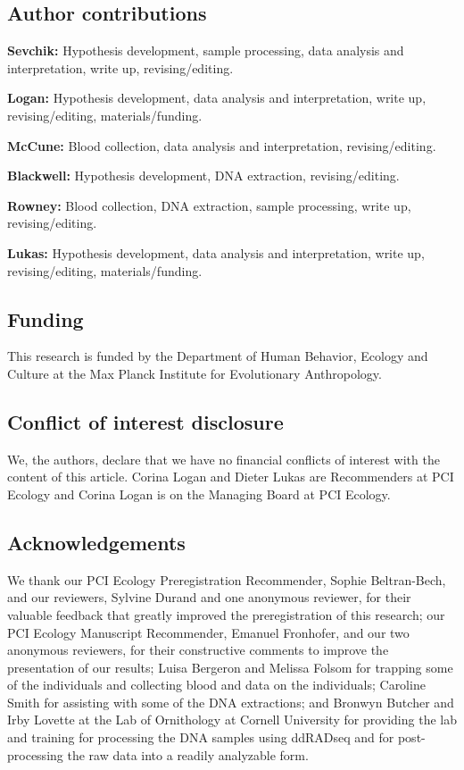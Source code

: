 \documentclass[]{article}
\begin{document}
\hypertarget{author-contributions}{%
\subsection{Author contributions}\label{author-contributions}}

\textbf{Sevchik:} Hypothesis development, sample processing, data
analysis and interpretation, write up, revising/editing.

\textbf{Logan:} Hypothesis development, data analysis and
interpretation, write up, revising/editing, materials/funding.

\textbf{McCune:} Blood collection, data analysis and interpretation,
revising/editing.

\textbf{Blackwell:} Hypothesis development, DNA extraction,
revising/editing.

\textbf{Rowney:} Blood collection, DNA extraction, sample processing,
write up, revising/editing.

\textbf{Lukas:} Hypothesis development, data analysis and
interpretation, write up, revising/editing, materials/funding.

\hypertarget{funding}{%
\subsection{Funding}\label{funding}}

This research is funded by the Department of Human Behavior, Ecology and
Culture at the Max Planck Institute for Evolutionary Anthropology.

\hypertarget{conflict-of-interest-disclosure}{%
\subsection{Conflict of interest
disclosure}\label{conflict-of-interest-disclosure}}

We, the authors, declare that we have no financial conflicts of interest
with the content of this article. Corina Logan and Dieter Lukas are
Recommenders at PCI Ecology and Corina Logan is on the Managing Board at
PCI Ecology.

\hypertarget{acknowledgements}{%
\subsection{Acknowledgements}\label{acknowledgements}}

We thank our PCI Ecology Preregistration Recommender, Sophie
Beltran-Bech, and our reviewers, Sylvine Durand and one anonymous
reviewer, for their valuable feedback that greatly improved the
preregistration of this research; our PCI Ecology Manuscript
Recommender, Emanuel Fronhofer, and our two anonymous reviewers, for
their constructive comments to improve the presentation of our results;
Luisa Bergeron and Melissa Folsom for trapping some of the individuals
and collecting blood and data on the individuals; Caroline Smith for
assisting with some of the DNA extractions; and Bronwyn Butcher and Irby
Lovette at the Lab of Ornithology at Cornell University for providing
the lab and training for processing the DNA samples using ddRADseq and
for post-processing the raw data into a readily analyzable form.
\end{document}
